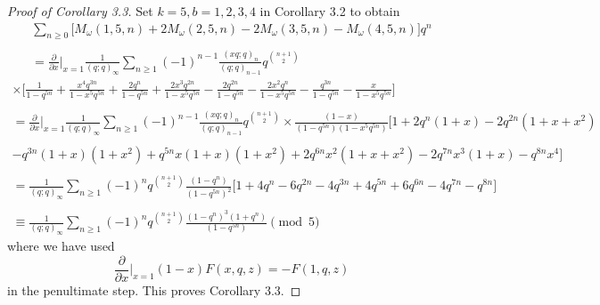 \documentclass[10pt,reqno]{amsart}
\begin{document}
\begin{proof}[Proof of Corollary 3.3] Set $k=5, b=1,2,3,4$ in Corollary 3.2 to obtain 
\begin{multline*}
        \displaystyle\sum_{n\geq 0}\big[M_{\omega}(1,5,n)+2M_{\omega}(2,5,n)-2M_{\omega}(3,5,n)-M_{\omega}(4,5,n)\big]q^n \\ \\
        =\displaystyle\frac{\partial}{\partial x}\Bigr\rvert_{x = 1}\displaystyle\frac{1}{(q;q)_{\infty}}\displaystyle\sum_{n\geq 1}(-1)^{n-1}\displaystyle\frac{(xq;q)_n}{(q;q)_{n-1}}q^{\binom{n+1}{2}} 
\end{multline*}
\begin{multline*}
        \times\Bigg[\displaystyle\frac{1}{1-q^{5n}}+\displaystyle\frac{x^4q^{3n}}{1-x^5q^{5n}}+\displaystyle\frac{2q^n}{1-q^{5n}}+\displaystyle\frac{2x^3q^{2n}}{1-x^5q^{5n}}-\displaystyle\frac{2q^{2n}}{1-q^{5n}}-\displaystyle\frac{2x^2q^n}{1-x^5q^{5n}}-\displaystyle\frac{q^{3n}}{1-q^{5n}}-\displaystyle\frac{x}{1-x^5q^{5n}}\Bigg] \\ \\
        =\displaystyle\frac{\partial}{\partial x}\Bigr\rvert_{x = 1}\displaystyle\frac{1}{(q;q)_{\infty}}\displaystyle\sum_{n\geq 1}(-1)^{n-1}\displaystyle\frac{(xq;q)_n}{(q;q)_{n-1}}q^{\binom{n+1}{2}}\times \displaystyle\frac{(1-x)}{(1-q^{5n})(1-x^5q^{5n})}\Bigg[1+2q^n(1+x)-2q^{2n}(1+x+x^2)\\ \\
        -q^{3n}(1+x)(1+x^2)+q^{5n}x(1+x)(1+x^2)+2q^{6n}x^2(1+x+x^2)-2q^{7n}x^3(1+x)-q^{8n}x^4\Bigg]\\ \\
        =\displaystyle\frac{1}{(q;q)_{\infty}}\displaystyle\sum_{n\geq 1}(-1)^{n}q^{\binom{n+1}{2}}\displaystyle\frac{(1-q^n)}{(1-q^{5n})^2}\Bigg[1+4q^n-6q^{2n}-4q^{3n}+4q^{5n}+6q^{6n}-4q^{7n}-q^{8n}\Bigg] \\ \\
        \equiv \displaystyle\frac{1}{(q;q)_{\infty}}\displaystyle\sum_{n\geq 1}(-1)^nq^{\binom{n+1}{2}}\displaystyle\frac{(1-q^n)^3(1+q^n)}{(1-q^{5n})}\pmod 5
\end{multline*}
where we have used $$\displaystyle\frac{\partial}{\partial x}\Bigr\rvert_{x = 1}(1-x)F(x,q,z)=-F(1,q,z)$$ in the penultimate step. This proves Corollary 3.3.
\end{proof}
\end{document}
